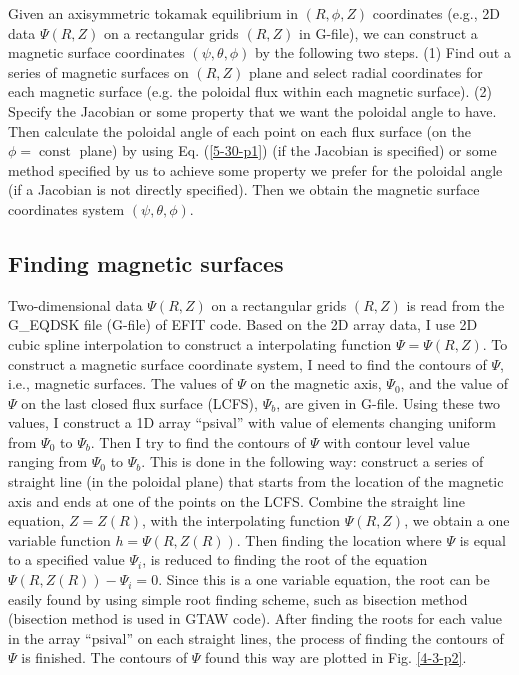 \documentclass{article}
\newcommand{\tmop}[1]{\ensuremath{\operatorname{#1}}}
\begin{document}
Given an axisymmetric tokamak equilibrium in $(R, \phi, Z)$ coordinates (e.g.,
2D data $\Psi (R, Z)$ on a rectangular grids $(R, Z)$ in G-file), we can
construct a magnetic surface coordinates $(\psi, \theta, \phi)$ by the
following two steps. (1) Find out a series of magnetic surfaces on $(R, Z)$
plane and select radial coordinates for each magnetic surface (e.g. the
poloidal flux within each magnetic surface). (2) Specify the Jacobian or some
property that we want the poloidal angle to have. Then calculate the poloidal
angle of each point on each flux surface (on the $\phi = \tmop{const}$ plane)
by using Eq. (\ref{5-30-p1}) (if the Jacobian is specified) or some method
specified by us to achieve some property we prefer for the poloidal angle (if
a Jacobian is not directly specified). Then we obtain the magnetic surface
coordinates system $(\psi, \theta, \phi)$.

\subsection{Finding magnetic surfaces}

Two-dimensional data $\Psi (R, Z)$ on a rectangular grids $(R, Z)$ is read
from the G\_EQDSK file (G-file) of EFIT code. Based on the 2D array data, I
use 2D cubic spline interpolation to construct a interpolating function $\Psi
= \Psi (R, Z)$. To construct a magnetic surface coordinate system, I need to
find the contours of $\Psi$, i.e., magnetic surfaces. The values of $\Psi$ on
the magnetic axis, $\Psi_0$, and the value of $\Psi$ on the last closed flux
surface (LCFS), $\Psi_b$, are given in G-file. Using these two values, I
construct a 1D array ``psival'' with value of elements changing uniform from
$\Psi_0$ to $\Psi_b$. Then I try to find the contours of $\Psi$ with contour
level value ranging from $\Psi_0$ to $\Psi_b$. This is done in the following
way: construct a series of straight line (in the poloidal plane) that starts
from the location of the magnetic axis and ends at one of the points on the
LCFS. Combine the straight line equation, $Z = Z (R)$, with the interpolating
function $\Psi (R, Z)$, we obtain a one variable function $h = \Psi (R, Z
(R))$. Then finding the location where $\Psi$ is equal to a specified value
$\Psi_i$, is reduced to finding the root of the equation $\Psi (R, Z (R)) -
\Psi_i = 0$. Since this is a one variable equation, the root can be easily
found by using simple root finding scheme, such as bisection method (bisection
method is used in GTAW code). After finding the roots for each value in the
array ``psival'' on each straight lines, the process of finding the contours
of $\Psi$ is finished. The contours of $\Psi$ found this way are plotted in
Fig. \ref{4-3-p2}.
\end{document}
